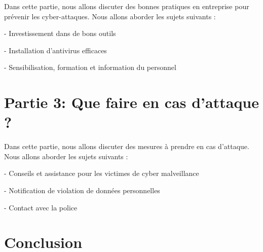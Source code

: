 \documentclass[a4paper,11pt]{article}
\begin{document}
Dans cette partie, nous allons discuter des bonnes pratiques en entreprise pour prévenir les cyber-attaques. Nous allons aborder les sujets suivants :

  - Investissement dans de bons outils

  - Installation d’antivirus efficaces

  - Sensibilisation, formation et information du personnel


\section{Partie 3: Que faire en cas d’attaque ?}

Dans cette partie, nous allons discuter des mesures à prendre en cas d’attaque. Nous allons aborder les sujets suivants :

  - Conseils et assistance pour les victimes de cyber malveillance

  - Notification de violation de données personnelles

  - Contact avec la police


\section{Conclusion}




\end{document}

